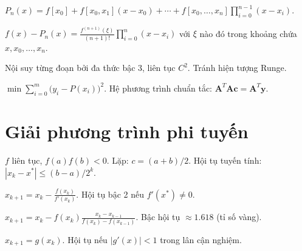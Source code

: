 \documentclass[12pt,a4paper]{article}
\begin{document}
\begin{congthuc}[title={Sai phân chia --- Newton}]
  $P_n(x) = f[x_0] + f[x_0, x_1](x - x_0) + \cdots + f[x_0, \ldots, x_n]\prod_{i=0}^{n-1}(x - x_i)$.
\end{congthuc}

\begin{dinhly}[title={Sai số nội suy}]
  $f(x) - P_n(x) = \frac{f^{(n+1)}(\xi)}{(n+1)!}\prod_{i=0}^{n}(x - x_i)$ với $\xi$ nào đó trong khoảng chứa $x, x_0, \ldots, x_n$.
\end{dinhly}

\begin{phuongphap}[title={Spline bậc 3}]
  Nội suy từng đoạn bởi đa thức bậc 3, liên tục $C^2$. Tránh hiện tượng Runge.
\end{phuongphap}

\begin{phuongphap}[title={Xấp xỉ bình phương tối thiểu}]
  $\min \sum_{i=0}^{m}\bigl(y_i - P(x_i)\bigr)^2$. Hệ phương trình chuẩn tắc: $\mathbf{A}^T\mathbf{A}\mathbf{c} = \mathbf{A}^T\mathbf{y}$.
\end{phuongphap}

\section{Giải phương trình phi tuyến}

\begin{phuongphap}[title={Chia đôi (Bisection)}]
  $f$ liên tục, $f(a)f(b) < 0$. Lặp: $c = (a+b)/2$. Hội tụ tuyến tính: $|x_k - x^*| \le (b-a)/2^k$.
\end{phuongphap}

\begin{phuongphap}[title={Newton--Raphson}]
  $x_{k+1} = x_k - \frac{f(x_k)}{f'(x_k)}$. Hội tụ bậc 2 nếu $f'(x^*) \ne 0$.
\end{phuongphap}

\begin{phuongphap}[title={Dây cung (Secant)}]
  $x_{k+1} = x_k - f(x_k)\frac{x_k - x_{k-1}}{f(x_k) - f(x_{k-1})}$. Bậc hội tụ $\approx 1.618$ (tỉ số vàng).
\end{phuongphap}

\begin{phuongphap}[title={Lặp điểm bất động}]
  $x_{k+1} = g(x_k)$. Hội tụ nếu $|g'(x)| < 1$ trong lân cận nghiệm.
\end{phuongphap}
\end{document}
